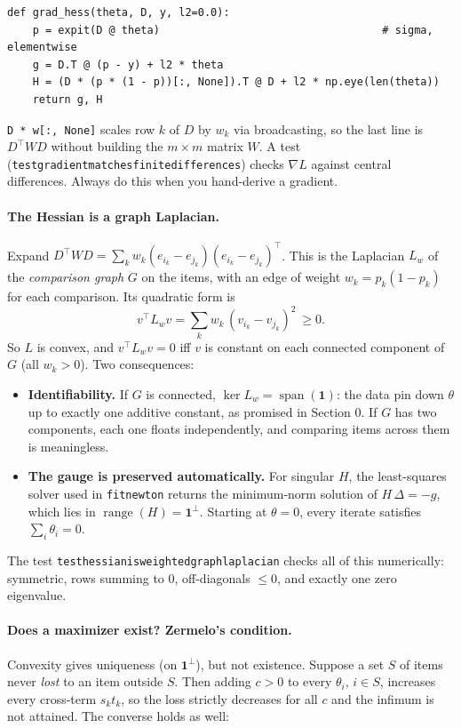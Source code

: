 \documentclass[11pt]{article}
\theoremstyle{definition}
\theoremstyle{plain}
\theoremstyle{remark}
\newcommand{\code}[1]{\texttt{#1}}
\renewcommand{\_}{\oldunderscore\allowbreak}
\newcommand{\file}[1]{\textcolor{blue!50!black}{\texttt{#1}}}
\newcommand{\codefrom}[1]{\par\smallskip\noindent{\footnotesize\textbf{From} \file{#1}}}
\begin{document}
\codefrom{src/calcdiff/models/bt.py}
\begin{lstlisting}
def grad_hess(theta, D, y, l2=0.0):
    p = expit(D @ theta)                                   # sigma, elementwise
    g = D.T @ (p - y) + l2 * theta
    H = (D * (p * (1 - p))[:, None]).T @ D + l2 * np.eye(len(theta))
    return g, H
\end{lstlisting}
\code{D * w[:, None]} scales row $k$ of $D$ by $w_k$ via broadcasting, so the last line is $D^\top WD$ without
building the $m\times m$ matrix $W$. A test (\code{test\_gradient\_matches\_finite\_differences}) checks $\nabla L$
against central differences. Always do this when you hand-derive a gradient.

\paragraph{The Hessian is a graph Laplacian.}
Expand $D^\top WD=\sum_kw_k(e_{i_k}-e_{j_k})(e_{i_k}-e_{j_k})^\top$. This is the Laplacian $L_w$ of the
\emph{comparison graph} $G$ on the items, with an edge of weight $w_k=p_k(1-p_k)$ for each comparison. Its quadratic form is
\[
  v^\top L_wv=\sum_kw_k\,(v_{i_k}-v_{j_k})^2\ \ge0 .
\]
So $L$ is convex, and $v^\top L_wv=0$ iff $v$ is constant on each connected component of $G$ (all $w_k>0$).
Two consequences:
\begin{itemize}[nosep]
\item \textbf{Identifiability.} If $G$ is connected, $\ker L_w=\operatorname{span}(\mathbf 1)$: the data pin down $\theta$
  up to exactly one additive constant, as promised in Section 0. If $G$ has two components, each one floats
  independently, and comparing items across them is meaningless.
\item \textbf{The gauge is preserved automatically.} For singular $H$, the least-squares solver
  used in \code{fit\_newton} returns the minimum-norm solution of $H\,\Delta=-g$, which lies in
  $\operatorname{range}(H)=\mathbf 1^\perp$. Starting at $\theta=0$, every iterate satisfies $\sum_i\theta_i=0$.
\end{itemize}
The test \code{test\_hessian\_is\_weighted\_graph\_laplacian} checks all of this numerically: symmetric,
rows summing to 0, off-diagonals $\le0$, and exactly one zero eigenvalue.

\paragraph{Does a maximizer exist? Zermelo's condition.}
Convexity gives uniqueness (on $\mathbf 1^\perp$), but not existence. Suppose a set $S$ of items never \emph{lost} to an item
outside $S$. Then adding $c>0$ to every $\theta_i$, $i\in S$, increases every cross-term $s_kt_k$, so the loss strictly
decreases for all $c$ and the infimum is not attained. The converse holds as well:
\end{document}
